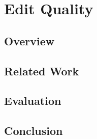 \chapter{Edit Quality}
    \section{Overview}
    \section{Related Work}
    \section{Evaluation}
    \section{Conclusion}

